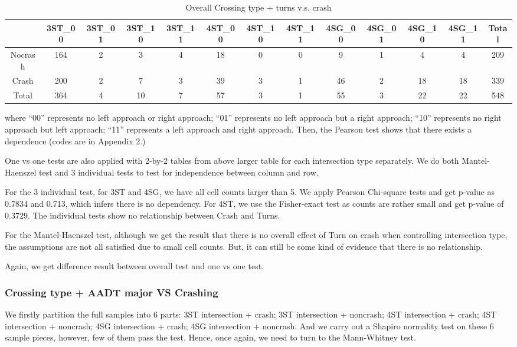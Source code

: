 \documentclass[11pt]{scrartcl} %
\begin{document}
\begin{table}[H]
\caption{Overall Crossing type + turns v.s. crash}
\centering
\tiny
\begin{tabular}{|c|c|c|c|c|c|c|c|c|c|c|c|c|}
\hline
      & 3ST\_00 & 3ST\_01 & 3ST\_10 & 3ST\_11 & 4ST\_00 & 4ST\_10 & 4ST\_11 & 4SG\_00 & 4SG\_01 & 4SG\_10 & 4SG\_11 & Total \\
\hline
Nocrash & 164  & 2 & 3 & 4 & 18 & 0 & 0 & 9 & 1 & 4 & 4 & 209\\
\hline
Crash   & 200  & 2 & 7 & 3 & 39 & 3 & 1 & 46 & 2 & 18 & 18 & 339 \\
\hline
Total   & 364  & 4 & 10 & 7 & 57 & 3 & 1 & 55 & 3 & 22 & 22 & 548\\
\hline
\end{tabular}
\end{table}

where ``00'' represents no left approach or right approach; ``01'' represents no left approach but a right approach; ``10'' represents no right approach but left approach; ``11'' represents a left approach and right approach. Then, the Pearson test shows that there exists a dependence (codes are in Appendix 2.)

One vs one tests are also applied with 2-by-2 tables from above larger table for each intersection type separately. We do both Mantel-Haenszel test and 3 individual tests to test for independence between column and row.

For the 3 individual test, for 3ST and 4SG, we have all cell counts larger than 5. We apply Pearson Chi-square tests and get p-value as 0.7834 and 0.713, which infers there is no dependency. For 4ST, we use the Fisher-exact test as counts are rather small and get p-value of 0.3729. The individual tests show no relationship between Crash and Turns.

For the Mantel-Haenszel test, although we get the result that there is no overall effect of Turn on crash when controlling intersection type, the assumptions are not all satisfied due to small cell counts. But, it can still be some kind of evidence that there is no relationship.

Again, we get difference result between overall test and one vs one test.

\subsubsection{Crossing type + AADT major VS Crashing}

We firstly partition the full samples into 6 parts: 3ST intersection + crash; 3ST intersection + noncrash; 4ST intersection + crash; 4ST intersection + noncrash; 4SG intersection + crash; 4SG intersection + noncrash. And we carry out a Shapiro normality test on these 6 sample pieces, however, few of them pass the test. Hence, once again, we need to turn to the Mann-Whitney test.
\end{document}
